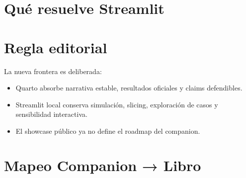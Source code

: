 \documentclass[
  spanish,
  11pt,
  letterpaper,
]{scrbook}
\providecommand{\tightlist}{%
  \setlength{\itemsep}{0pt}\setlength{\parskip}{0pt}}
\theoremstyle{plain}
\theoremstyle{remark}
\begin{document}
\section{Qué resuelve Streamlit}\label{sec-streamlit-companion}

\section{Regla editorial}\label{regla-editorial-2}

La nueva frontera es deliberada:

\begin{itemize}
\tightlist
\item
  Quarto absorbe narrativa estable, resultados oficiales y claims
  defendibles.
\item
  Streamlit local conserva simulación, slicing, exploración de casos y
  sensibilidad interactiva.
\item
  El showcase público ya no define el roadmap del companion.
\end{itemize}

\section{Mapeo Companion → Libro}\label{mapeo-companion-libro}
\end{document}
